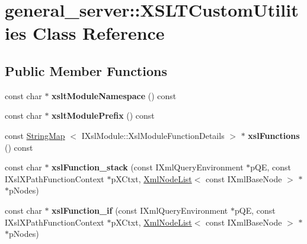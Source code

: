 \hypertarget{classgeneral__server_1_1XSLTCustomUtilities}{\section{general\-\_\-server\-:\-:\-X\-S\-L\-T\-Custom\-Utilities \-Class \-Reference}
\label{classgeneral__server_1_1XSLTCustomUtilities}
}
\subsection*{\-Public \-Member \-Functions}
\begin{DoxyCompactItemize}
\item 
\hypertarget{classgeneral__server_1_1XSLTCustomUtilities_a342342ae3e091adf6ccce54b71a9232d}{const char $\ast$ {\bfseries xslt\-Module\-Namespace} () const }\label{classgeneral__server_1_1XSLTCustomUtilities_a342342ae3e091adf6ccce54b71a9232d}

\item 
\hypertarget{classgeneral__server_1_1XSLTCustomUtilities_ad96d6c17ea026c12294df7c3cd7d4180}{const char $\ast$ {\bfseries xslt\-Module\-Prefix} () const }\label{classgeneral__server_1_1XSLTCustomUtilities_ad96d6c17ea026c12294df7c3cd7d4180}

\item 
\hypertarget{classgeneral__server_1_1XSLTCustomUtilities_a750c77a1ce6d1f65753f3b37eac2cd4e}{const \hyperlink{classgeneral__server_1_1StringMap}{\-String\-Map}\*
$<$ \-I\-Xsl\-Module\-::\-Xsl\-Module\-Function\-Details $>$ $\ast$ {\bfseries xsl\-Functions} () const }\label{classgeneral__server_1_1XSLTCustomUtilities_a750c77a1ce6d1f65753f3b37eac2cd4e}

\item 
\hypertarget{classgeneral__server_1_1XSLTCustomUtilities_a4ab1b1d0f11dd9d614dee8660bc32c05}{const char $\ast$ {\bfseries xsl\-Function\-\_\-stack} (const \-I\-Xml\-Query\-Environment $\ast$p\-Q\-E, const \-I\-Xsl\-X\-Path\-Function\-Context $\ast$p\-X\-Ctxt, \hyperlink{classgeneral__server_1_1XmlNodeList}{\-Xml\-Node\-List}$<$ const \-I\-Xml\-Base\-Node $>$ $\ast$$\ast$p\-Nodes)}\label{classgeneral__server_1_1XSLTCustomUtilities_a4ab1b1d0f11dd9d614dee8660bc32c05}

\item 
\hypertarget{classgeneral__server_1_1XSLTCustomUtilities_a3543bcd8c07fe8d3229e1dde8a1a0d99}{const char $\ast$ {\bfseries xsl\-Function\-\_\-if} (const \-I\-Xml\-Query\-Environment $\ast$p\-Q\-E, const \-I\-Xsl\-X\-Path\-Function\-Context $\ast$p\-X\-Ctxt, \hyperlink{classgeneral__server_1_1XmlNodeList}{\-Xml\-Node\-List}$<$ const \-I\-Xml\-Base\-Node $>$ $\ast$$\ast$p\-Nodes)}\label{classgeneral__server_1_1XSLTCustomUtilities_a3543bcd8c07fe8d3229e1dde8a1a0d99}


\end{DoxyCompactItemize}
